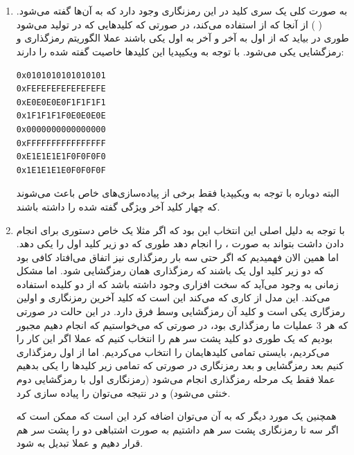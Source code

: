 \documentclass[]{article}
\begin{document}
\section{}
\begin{enumerate}
    \item به صورت کلی یک سری کلید در این رمزنگاری وجود دارد که به آن‌ها  گفته می‌شود.
    ( )
    از آنجا که
     از  استفاده می‌کند،
    در صورتی که کلید‌هایی که در
    تولید می‌شود طوری در بیاید که از اول به آخر و آخر به اول یکی باشند عملا الگوریتم
    رمزگذاری و رمزگشایی یکی می‌شود. با توجه به ویکیپدیا این کلید‌ها خاصیت گفته شده را دارند:
    \begin{latin}
    \begin{lstlisting}
0x0101010101010101
0xFEFEFEFEFEFEFEFE
0xE0E0E0E0F1F1F1F1
0x1F1F1F1F0E0E0E0E
0x0000000000000000
0xFFFFFFFFFFFFFFFF
0xE1E1E1E1F0F0F0F0
0x1E1E1E1E0F0F0F0F
\end{lstlisting}
    \end{latin}
    البته دوباره با توجه به ویکیپدیا فقط برخی از پیاده‌سازی‌های خاص باعث می‌شوند که چهار کلید آخر ویژگی گفته شده را داشته باشند.
    \item با توجه به
    دلیل اصلی این انتخاب این بود که اگر مثلا یک
    خاص دستوری برای انجام دادن
    داشت بتواند به صورت
    ، 
    را انجام دهد طوری که دو زیر کلید اول را یکی دهد. اما همین الان فهمیدیم که اگر حتی سه بار رمزگذاری نیز
    اتفاق می‌افتاد کافی بود که دو زیر کلید اول یک
    باشند که رمزگذاری همان رمزگشایی شود. اما مشکل زمانی به وجود می‌آید که سخت افزاری وجود داشته باشد
    که از
     دو کلیده
    استفاده می‌کند. این مدل از
    کاری که می‌کند این است که کلید آخرین رمزنگاری و اولین رمزگاری یکی است و کلید آن رمزگشایی وسط فرق دارد.
    در این حالت در صورتی که هر 3 عملیات ما رمزگذاری بود، در صورتی که می‌خواستیم که
    انجام دهیم مجبور بودیم که یک طوری دو کلید پشت سر هم را
    انتخاب کنیم که عملا اگر این کار را می‌کردیم، بایستی تمامی کلید‌هایمان را
    انتخاب می‌کردیم. اما از اول رمزگذاری کنیم بعد رمزگشایی و بعد رمزنگاری در صورتی که تمامی
    زیر کلید‌ها را یکی بدهیم عملا فقط یک مرحله رمزگذاری انجام می‌شود
    (رمزنگاری اول با رمزگشایی دوم خنثی می‌شود)
    و در نتیجه می‌توان
    را پیاده سازی کرد.

    همچنین یک مورد دیگر که به آن می‌توان اضافه کرد این است که ممکن است که اگر سه تا رمزنگاری پشت سر هم داشتیم
    به صورت اشتباهی دو
    را پشت سر هم قرار دهیم و عملا
     تبدیل به 
    شود.
\end{enumerate}
\end{document}
